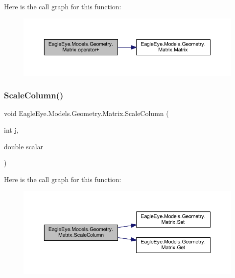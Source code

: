 Here is the call graph for this function\+:\nopagebreak
\begin{figure}[H]
\begin{center}
\leavevmode
\includegraphics[width=350pt]{class_eagle_eye_1_1_models_1_1_geometry_1_1_matrix_acb6f6c5a5aa600c91c1fac3952be8057_cgraph}
\end{center}
\end{figure}
\mbox{\label{class_eagle_eye_1_1_models_1_1_geometry_1_1_matrix_a43304b460f0e9071e9a1fd2f2cda73b8}} 
\subsubsection{\texorpdfstring{ScaleColumn()}{ScaleColumn()}}
{\footnotesize\ttfamily void Eagle\+Eye.\+Models.\+Geometry.\+Matrix.\+Scale\+Column (\begin{DoxyParamCaption}\item[{int}]{j,  }\item[{double}]{scalar }\end{DoxyParamCaption})}

Here is the call graph for this function\+:\nopagebreak
\begin{figure}[H]
\begin{center}
\leavevmode
\includegraphics[width=350pt]{class_eagle_eye_1_1_models_1_1_geometry_1_1_matrix_a43304b460f0e9071e9a1fd2f2cda73b8_cgraph}
\end{center}
\end{figure}
\mbox{\label{class_eagle_eye_1_1_models_1_1_geometry_1_1_matrix_aeebb46e5118b02be93b0c75df62ff1ef}} 
